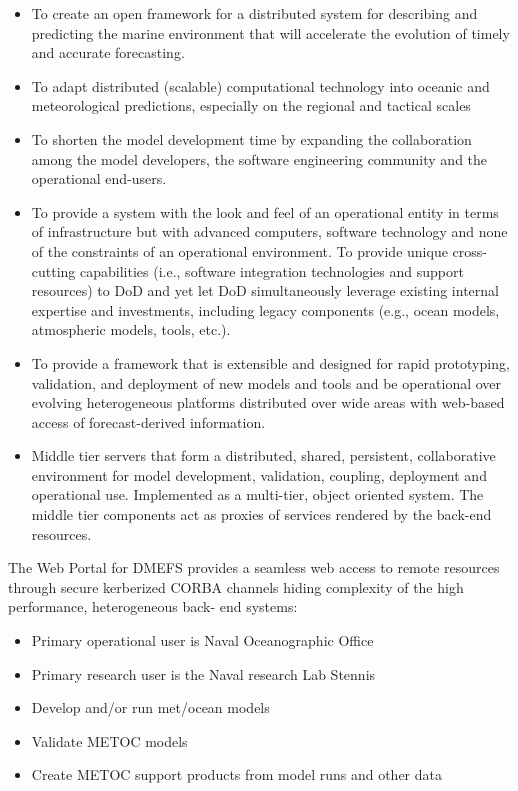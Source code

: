 \begin{itemize}
\item To create an open framework for a distributed system for describing and predicting the 
marine environment that will accelerate the evolution of timely and accurate forecasting. 
\item To adapt distributed (scalable) computational technology into oceanic and meteorological 
predictions, especially on the regional and tactical scales
\item To shorten the model development time by expanding the
collaboration among the model 
developers, the software engineering community and the operational end-users. 
\item To provide a system with the look and feel of an operational entity in terms of infrastructure 
but with advanced computers, software technology and none of the constraints of an 
operational environment. To provide unique cross-cutting capabilities (i.e., software 
integration technologies and support resources) to DoD and yet let DoD simultaneously 
leverage existing internal expertise and investments, including legacy components (e.g., 
ocean models, atmospheric models, tools, etc.). 
\item To provide a framework that is extensible and designed for rapid prototyping, validation, and 
deployment of new models and tools and be operational over evolving heterogeneous 
platforms distributed over wide areas with web-based access of forecast-derived information.
\item Middle tier servers that form a distributed, shared, persistent, collaborative environment for 
model development, validation, coupling, deployment and operational use. Implemented as a 
multi-tier, object oriented system. The middle tier components act as proxies of services 
rendered by the back-end resources.
\end{itemize}

The Web Portal for DMEFS provides a seamless web access to remote resources through secure 
kerberized CORBA channels hiding complexity of the high performance, heterogeneous back-
end systems:
\begin{itemize}
\item Primary operational user is Naval Oceanographic Office
\item Primary research user is the Naval research Lab Stennis
\item Develop and/or run met/ocean models
\item Validate METOC models
\item Create METOC support products from model runs and other data
\end{itemize}

